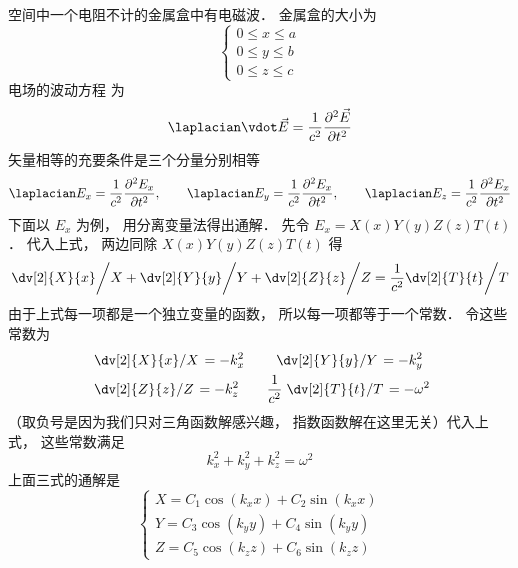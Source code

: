 
空间中一个电阻不计的金属盒中有电磁波．
金属盒的大小为 
\begin{equation}
\left\{ \begin{array}{l}
0 \le x \le a\\
0 \le y \le b\\
0 \le z \le c
\end{array} \right.
\end{equation} 
电场的波动方程%
为
\begin{equation}
{\laplacian} \vdot \vec E = \frac{1}{{{c^2}}}\frac{{{\partial ^2}\vec E}}{{\partial {t^2}}}
\end{equation}  
矢量相等的充要条件是三个分量分别相等
\begin{equation}
{\laplacian}{E_x} = \frac{1}{{{c^2}}}\frac{{{\partial ^2}{E_x}}}{{\partial {t^2}}},
\qquad
{\laplacian}{E_y} = \frac{1}{{{c^2}}}\frac{{{\partial ^2}{E_x}}}{{\partial {t^2}}},
\qquad
{\laplacian}{E_z} = \frac{1}{{{c^2}}}\frac{{{\partial ^2}{E_x}}}{{\partial {t^2}}}
\end{equation}   
下面以 $E_x$ 为例， 用分离变量法得出通解．
先令 ${E_x} = X\left( x \right)Y\left( y \right)Z\left( z \right)T\left( t \right)$． 代入上式， 两边同除 $X\left( x \right)Y\left( y \right)Z\left( z \right)T\left( t \right)$ 得
\begin{equation}
\left. \dv[2]{X}{x} \middle/ X + \dv[2]{Y}{y} \middle/ Y + \dv[2]{Z}{z} \middle/ Z  = \frac{1}{c^2}  \dv[2]{T}{t} \middle/ T\right.
\end{equation}
由于上式每一项都是一个独立变量的函数， 所以每一项都等于一个常数． 令这些常数为
\begin{equation}\begin{aligned}
&\left. \dv[2]{X}{x} \middle/ X \right. = -k_x^2
\qquad
\left. \dv[2]{Y}{y} \middle/ Y \right. = -k_y^2\\
&\left. \dv[2]{Z}{z} \middle/ Z \right. = -k_z^2
\qquad
\frac{1}{c^2} \left. \dv[2]{T}{t} \middle/ T \right. = -\omega^2
\end{aligned}\end{equation}
（取负号是因为我们只对三角函数解感兴趣， 指数函数解在这里无关）代入上式， 这些常数满足
\begin{equation}
k_x^2 + k_y^2 + k_z^2 = {\omega ^2}
\end{equation} 
上面三式的通解是
\begin{equation}
\left\{ \begin{array}{l}
X = {C_1}\cos \left( {{k_x}x} \right) + {C_2}\sin \left( {{k_x}x} \right)\\
Y = {C_3}\cos \left( {{k_y}y} \right) + {C_4}\sin \left( {{k_y}y} \right)\\
Z = {C_5}\cos \left( {{k_z}z} \right) + {C_6}\sin \left( {{k_z}z} \right)
\end{array} \right.
\end{equation} 
